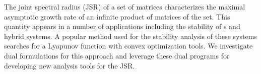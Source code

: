 The joint spectral radius (JSR) of a set of matrices characterizes the
maximal asymptotic growth rate of an infinite product of matrices of
the set.  This quantity appears in a number of applications including
the stability of s\witch{} and hybrid systems. A popular method used for
the stability analysis of these systems searches for a Lyapunov function with convex optimization tools.
We investigate dual formulations for this %
approach
and leverage these dual programs for developing new analysis tools for the JSR.
